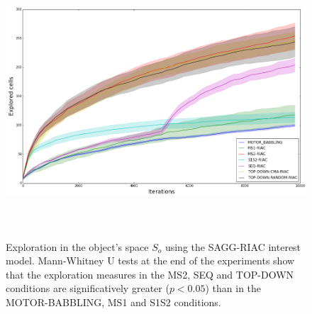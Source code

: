 \documentclass[12pt]{article}
\begin{document}

		\begin{figure}[h]
			\centering
			\includegraphics[height=4in]{./include/explo-2015-04-18_02-19-01-explaupoppydiva-riac-cube.png}
			\caption{Exploration in the object's space $S_o$ using the SAGG-RIAC interest model.
			Mann-Whitney U tests at the end of the experiments show that the exploration measures in the MS2, SEQ and TOP-DOWN conditions
			are significatively greater ($p<0.05$) than in the MOTOR-BABBLING, MS1 and S1S2 conditions.			
		}
			\label{explo_vrep}
		\end{figure}
\end{document}

